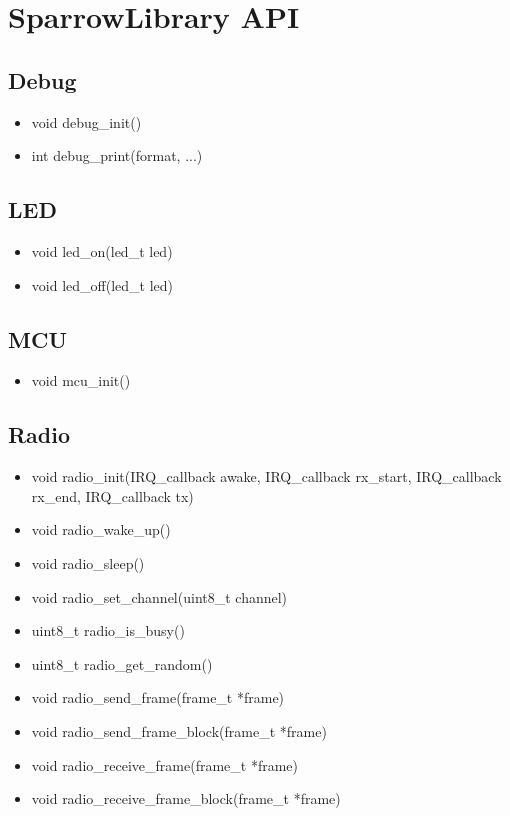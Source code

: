 
\chapter{SparrowLibrary API}

\section{Debug}
\begin{itemize}
	\item void debug\_init()
	\item int debug\_print(format, ...)
\end{itemize}

\section{LED}
\begin{itemize}
	\item void led\_on(led\_t led)
	\item void led\_off(led\_t led)
\end{itemize}

\section{MCU}
\begin{itemize}
	\item void mcu\_init()
\end{itemize}

\section{Radio}
\begin{itemize}
	\item void radio\_init(IRQ\_callback awake, IRQ\_callback rx\_start,
		IRQ\_callback rx\_end, IRQ\_callback tx)
	\item void radio\_wake\_up()
	\item void radio\_sleep()
	\item void radio\_set\_channel(uint8\_t channel)
	\item uint8\_t radio\_is\_busy()
	\item uint8\_t radio\_get\_random()
	\item void radio\_send\_frame(frame\_t *frame)
	\item void radio\_send\_frame\_block(frame\_t *frame)
	\item void radio\_receive\_frame(frame\_t *frame)
	\item void radio\_receive\_frame\_block(frame\_t *frame)
\end{itemize}

